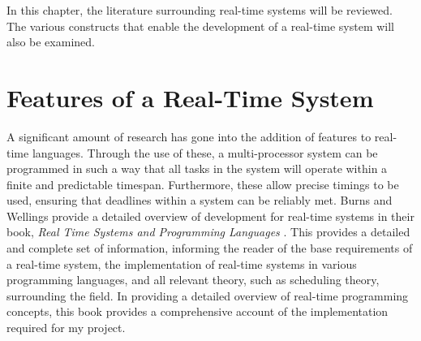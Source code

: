 



In this chapter, the literature surrounding real-time systems will be
reviewed. The various constructs that enable the development of a real-time
system will also be examined.

\section{Features of a Real-Time System}

A significant amount of research has gone into the addition of features to
real-time languages. Through the use of these, a multi-processor system can be
programmed in such a way that all tasks in the system will operate within a
finite and predictable timespan. Furthermore, these allow precise timings to be
used, ensuring that deadlines within a system can be reliably met.  Burns and
Wellings provide a detailed overview of development for real-time systems in
their book, \emph{Real Time Systems and Programming Languages}
\cite{real-time-systems}.  This provides a detailed and complete set of
information, informing the reader of the base requirements of a real-time
system, the implementation of real-time systems in various programming
languages, and all relevant theory, such as scheduling theory, surrounding the
field. In providing a detailed overview of real-time programming concepts, 
this book provides a comprehensive account of the implementation required for my project.

